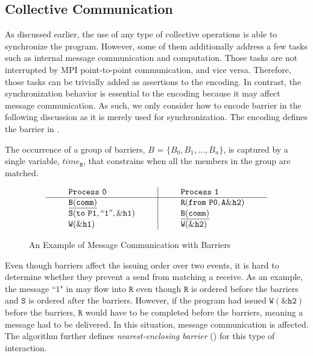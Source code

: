 \subsection{Collective Communication}
As discussed earlier, the use of any type of collective operations is able to synchronize the program. However, some of them additionally address a few tasks such as internal message communication and computation. Those tasks are not interrupted by MPI point-to-point communication, and vice versa. Therefore, those tasks can be trivially added as assertions to the encoding. In contrast, the synchronization behavior is essential to the encoding because it may affect message communication. As such, we only consider how to encode barrier in the following discussion as it is merely used for synchronization. The encoding defines the barrier in . 

\begin{definition}[Barrier]\label{def:barrier}
The occurrence of a group of barriers, $B$ = $\{B_0, B_1, ..., B_n\}$, is captured by a
single variable, $\mathit{time}_\mathtt{B}$, that constrains when all the members in the group are matched.  
\end{definition}

\begin{figure}[h]
\[
\begin{array}{l|l}
\;\;\;\;\;\;\;\;\mathtt{Process\ 0}\;\;\;\;\;\;\;\; & \;\;\;\;\;\;\;\; \mathtt{Process\ 1}\;\;\;\;\;\;\;\; \\
\hline
\;\;\;\;\;\;\;\;\mathtt{\underline{B(comm)}}\;\;\;\;\;\;\;\; & \;\;\;\;\;\;\;\; \mathtt{R(from\ P0,A\&h2)}\;\;\;\;\;\;\;\; \\
\;\;\;\;\;\;\;\;\mathtt{S(to\ P1,``1",\&h1)}\;\;\;\;\;\;\;\; & \;\;\;\;\;\;\;\; \mathtt{\underline{B(comm)}}\;\;\;\;\;\;\;\; \\
\;\;\;\;\;\;\;\;\mathtt{W(\&h1)}\;\;\;\;\;\;\;\; & \;\;\;\;\;\;\;\; \mathtt{W(\&h2)}\;\;\;\;\;\;\;\; \\
\end{array}
\]
\caption{An Example of Message Communication with Barriers} \label{fig:mc_barrier1}
\end{figure}

Even though barriers affect the issuing order over two events, it is hard to determine whether they prevent a send from matching a receive. As an example, the message ``$1$" in  may flow into $\mathtt{R}$ even though $\mathtt{R}$ is ordered before the barriers and $\mathtt{S}$ is ordered after the barriers. However, if the program had issued $\mathtt{W(\&h2)}$ before the barriers, $\mathtt{R}$ would have to be completed before the barriers, meaning a message had to be delivered. In this situation, message communication is affected. The algorithm further defines \textit{nearest-enclosing barrier} () for this type of interaction.

